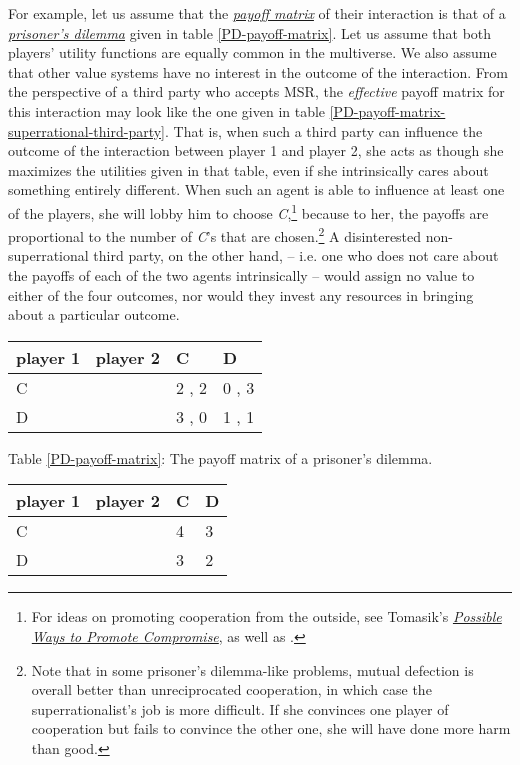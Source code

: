 For example, let us assume that the
\href{https://en.wikipedia.org/wiki/Normal-form_game}{\emph{payoff
matrix}} of their interaction is that of a
\href{https://en.wikipedia.org/wiki/Prisoner\%27s_dilemma}{\emph{prisoner's
dilemma}} given in table \ref{PD-payoff-matrix}. Let us
assume that both players' utility functions are equally common in the
multiverse. We also assume that other value systems have no interest in
the outcome of the interaction. From the perspective of a third party
who accepts MSR, the \emph{effective} payoff matrix for this interaction
may look like the one given in table
\ref{PD-payoff-matrix-superrational-third-party}. That
is, when such a third party can influence the outcome of the interaction
between player 1 and player 2, she acts as though she maximizes the
utilities given in that table, even if she intrinsically cares about
something entirely different. When such an agent is able to influence at
least one of the players, she will lobby him to choose
\emph{C},\footnote{For ideas on promoting cooperation from the outside,
  see Tomasik's
  \href{https://foundational-research.org/possible-ways-to-promote-compromise/}{\emph{\emph{Possible
  Ways to Promote Compromise}}}, as well as
  \parencite{Axelrod2006-ci}.} because to her, the payoffs
are proportional to the number of \emph{C}'s that are chosen.\footnote{Note
  that in some prisoner's dilemma-like problems, mutual defection is
  overall better than unreciprocated cooperation, in which case the
  superrationalist's job is more difficult. If she convinces one player
  of cooperation but fails to convince the other one, she will have done
  more harm than good.} A disinterested non-superrational third party,
on the other hand, -- i.e. one who does not care about the payoffs of
each of the two agents intrinsically -- would assign no value to either
of the four outcomes, nor would they invest any resources in bringing
about a particular outcome.

\begin{longtable}[]{@{}lll@{}}
\toprule
player 1 \ player 2 & C & D\tabularnewline
\midrule
\endhead
C & 2 , 2 & 0 , 3\tabularnewline
D & 3 , 0 & 1 , 1\tabularnewline
\bottomrule
\end{longtable}

Table \ref{PD-payoff-matrix}: The payoff matrix of a prisoner's dilemma.

\begin{longtable}[]{@{}lll@{}}
\toprule
player 1 \ player 2 & C & D\tabularnewline
\midrule
\endhead
C & 4 & 3\tabularnewline
D & 3 & 2\tabularnewline
\bottomrule
\end{longtable}


